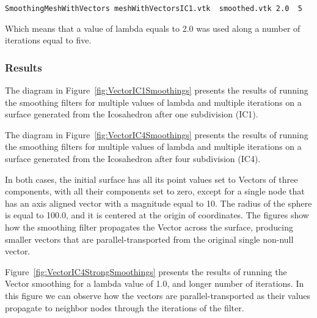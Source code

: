 \documentclass{InsightArticle}
\begin{document}
\begin{verbatim}
SmoothingMeshWithVectors meshWithVectorsIC1.vtk  smoothed.vtk 2.0  5
\end{verbatim}

Which means that a value of lambda equals to 2.0 was used along a number of
iterations equal to five.

\subsubsection{Results}

The diagram in Figure~\ref{fig:VectorIC1Smoothings} presents the results of
running the smoothing filters for multiple values of lambda and multiple
iterations on a surface generated from the Icosahedron after one subdivision
(IC1).

The diagram in Figure~\ref{fig:VectorIC4Smoothings} presents the results of
running the smoothing filters for multiple values of lambda and multiple
iterations on a surface generated from the Icosahedron after four subdivision
(IC4).

In both cases, the initial surface has all its point values set to Vectors of
three components, with all their components set to zero, except for a single
node that has an axis aligned vector with a magnitude equal to 10. The radius
of the sphere is equal to 100.0, and it is centered at the origin of
coordinates. The figures show how the smoothing filter propagates the Vector
across the surface, producing smaller vectors that are parallel-transported
from the original single non-null vector.

Figure~\ref{fig:VectorIC4StrongSmoothings} presents the results of running the
Vector smoothing for a lambda value of 1.0, and longer number of iterations. In
this figure we can observe how the vectors are parallel-transported as their
values propagate to neighbor nodes through the iterations of the filter.

\clearpage
\end{document}
